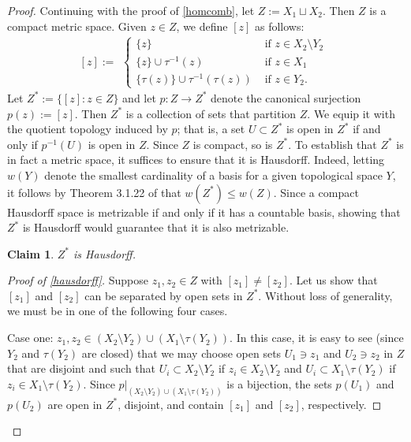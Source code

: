 \documentclass[12pt]{amsart}
\numberwithin{equation}{section}
\newtheorem{claim}{Claim}[theorem]
\theoremstyle{definition}
\theoremstyle{remark}
\begin{document}
\begin{proof}
	Continuing with the proof of \autoref{homcomb}, let $Z:=X_{1}\sqcup X_{2}$. Then $Z$ is a compact metric space. Given $z\in Z$, we define $[z]$ as follows:
	$$
	[z]:=
	\begin{aligned}
	\begin{cases}
	\{z\}&\text{ if }z\in X_{2}\setminus Y_{2}\\
	\{z\}\cup\tau^{-1}(z)&\text{ if }z\in X_{1}\\
	\{\tau(z)\}\cup\tau^{-1}(\tau(z))&\text{ if }z\in Y_{2}.
	\end{cases}
	\end{aligned}
	$$
	Let $Z^{*}:=\{[z]:z\in Z\}$ and let $p\colon Z\to Z^{*}$ denote the canonical surjection $p(z):=[z]$. Then $Z^{*}$ is a collection of sets that partition $Z$. We equip it with the quotient topology induced by $p$; that is, a set $U\subset Z^{*}$ is open in $Z^{*}$ if and only if $p^{-1}(U)$ is open in $Z$. Since $Z$ is compact, so is $Z^{*}$. To establish that $Z^{*}$ is in fact a metric space, it suffices to ensure that it is Hausdorff. Indeed, letting $w(Y)$ denote the smallest cardinality of a basis for a given topological space $Y$, it follows by Theorem 3.1.22 of \cite{eng} that $w(Z^{*})\leq w(Z)$. Since a compact Hausdorff space is metrizable if and only if it has a countable basis, showing that $Z^{*}$ is Hausdorff would guarantee that it is also metrizable. 
	
	\begin{claim}
		\label{hausdorff}
		$Z^{*}$ is Hausdorff.
	\end{claim}
	
	\begin{proof}[Proof of \autoref{hausdorff}]
		Suppose $z_{1},z_{2}\in Z$ with $[z_{1}]\not=[z_{2}]$. Let us show that $[z_{1}]$ and $[z_{2}]$ can be separated by open sets in $Z^{*}$. Without loss of generality, we must be in one of the following four cases. 
		
		Case one: $z_{1},z_{2}\in (X_{2}\setminus Y_{2})\cup (X_{1}\setminus \tau(Y_{2}))$. In this case, it is easy to see (since $Y_{2}$ and $\tau(Y_{2})$ are closed) that we may choose open sets $U_{1}\ni z_{1}$ and $U_{2}\ni z_{2}$ in $Z$ that are disjoint and such that $U_{i}\subset X_{2}\setminus Y_{2}$ if $z_{i}\in X_{2}\setminus Y_{2}$ and $U_{i}\subset X_{1}\setminus \tau(Y_{2})$ if $z_{i}\in X_{1}\setminus \tau(Y_{2})$. Since $p|_{(X_{2}\setminus Y_{2})\cup (X_{1}\setminus \tau(Y_{2}))}$ is a bijection, the sets $p(U_{1})$ and $p(U_{2})$ are open in $Z^{*}$, disjoint, and contain $[z_{1}]$ and $[z_{2}]$, respectively. 
		

\end{proof}
\end{proof}
\end{document}

